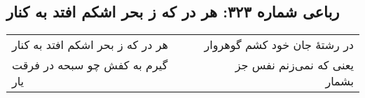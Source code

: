 \begin{center}
\section*{رباعی شماره ۳۲۳: هر در که ز بحر اشکم افتد به کنار}
\label{sec:sh323}
\begin{longtable}{l p{0.5cm} r}
هر در که ز بحر اشکم افتد به کنار
&&
در رشتهٔ جان خود کشم گوهروار
\\
گیرم به کفش چو سبحه در فرقت یار
&&
یعنی که نمی‌زنم نفس جز بشمار
\\
\end{longtable}
\end{center}
